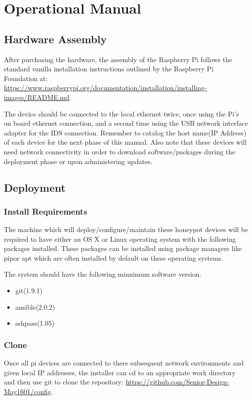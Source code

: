 \chapter{Operational Manual}

\section{Hardware Assembly}

After purchasing the hardware, the assembly of the Raspberry Pi follows the standard vanilla installation instructions outlined by the Raspberry Pi Foundation at: \url{https://www.raspberrypi.org/documentation/installation/installing-images/README.md}.


The device should be connected to the local ethernet twice, once using the Pi's on board ethernet connection, and a second time using the USB network interface adapter for the IDS connection. Remember to catalog the host name(IP Address) of each device for the next phase of this manual. Also note that these devices will need network connectivity in order to download software/packages during the deployment phase or upon administering updates.

\section{Deployment}
\subsection{Install Requirements}
The machine which will deploy/configure/maintain these honeypot devices will be required to have either an OS X or Linux operating system with the following packages installed. These packages can be installed using package managers like pipor apt which are often installed by default on these operating systems. 

The system should have the following minnimum software version.
\begin{itemize}
\item git(1.9.1)
\item ansible(2.0.2)
\item sshpass(1.05)
\end{itemize}

\subsection{Clone}
Once all pi devices are connected to there subsequent network environments and given local IP addresses, the installer can cd to an appropriate work directory and then use git to clone the repository: \url{https://github.com/Senior-Design-May1601/config}.


